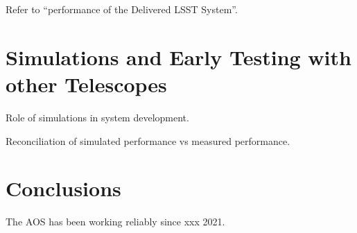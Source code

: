Refer to ``performance of the Delivered LSST System''.

\section{Simulations and Early Testing with other Telescopes}

Role of simulations in system development.

Reconciliation of simulated performance vs measured performance.

\section{Conclusions}

The AOS has been working reliably since xxx 2021.
